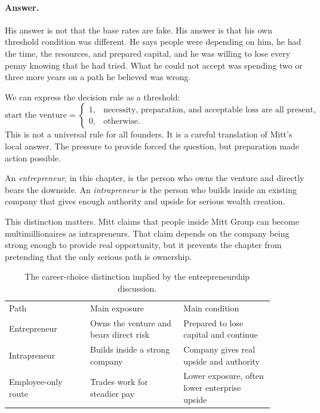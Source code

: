 \paragraph{Answer.}
His answer is not that the base rates are fake. His answer is that his own threshold condition was different. He says people were depending on him, he had the time, the resources, and prepared capital, and he was willing to lose every penny knowing that he had tried. What he could not accept was spending two or three more years on a path he believed was wrong.

We can express the decision rule as a threshold:
\begin{equation}
\text{start the venture}
=
\begin{cases}
1, & \text{necessity, preparation, and acceptable loss are all present},\\
0, & \text{otherwise}.
\end{cases}
\end{equation}
This is not a universal rule for all founders. It is a careful translation of Mitt's local answer. The pressure to provide forced the question, but preparation made action possible.

\begin{definition}
An \emph{entrepreneur}, in this chapter, is the person who owns the venture and directly bears the downside. An \emph{intrapreneur} is the person who builds inside an existing company that gives enough authority and upside for serious wealth creation.
\end{definition}

This distinction matters. Mitt claims that people inside Mitt Group can become multimillionaires as intrapreneurs. That claim depends on the company being strong enough to provide real opportunity, but it prevents the chapter from pretending that the only serious path is ownership.

\begin{table}
\centering
\begin{tabular}{p{0.27\linewidth}p{0.31\linewidth}p{0.30\linewidth}}
Path & Main exposure & Main condition \\
Entrepreneur & Owns the venture and bears direct risk & Prepared to lose capital and continue \\
Intrapreneur & Builds inside a strong company & Company gives real upside and authority \\
Employee-only route & Trades work for steadier pay & Lower exposure, often lower enterprise upside \\
\end{tabular}
\caption{The career-choice distinction implied by the entrepreneurship discussion.}
\end{table}

